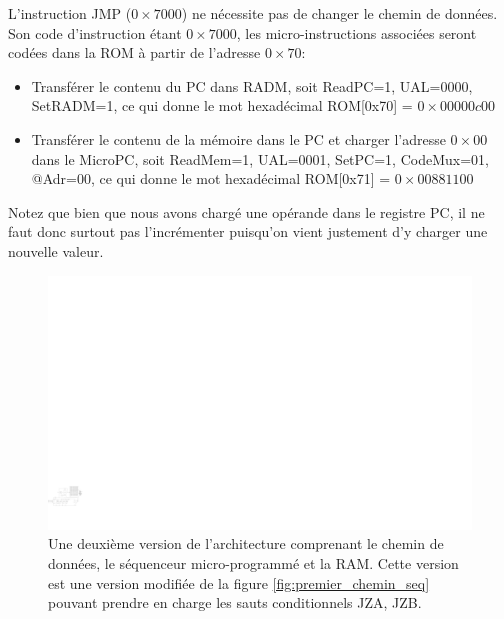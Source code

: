 L'instruction JMP ($0\times7000$) ne nécessite pas de changer le chemin de données. Son code d'instruction étant $0\times7000$, les micro-instructions associées seront codées dans la ROM à partir de l'adresse $0\times70$:
\begin{itemize}
\item Transférer le contenu du PC dans RADM, soit ReadPC=1, UAL=0000, SetRADM=1, ce qui donne le mot hexadécimal ROM[0x70] = $0\times00000c00$
\item Transférer le contenu de la mémoire dans le PC et charger l'adresse $0\times00$ dans le MicroPC, soit ReadMem=1, UAL=0001, SetPC=1, CodeMux=01, @Adr=00, ce qui donne le mot hexadécimal ROM[0x71] = $0\times00881100$
\end{itemize}
Notez que bien que nous avons chargé une opérande dans le registre PC, il ne faut donc surtout pas l'incrémenter puisqu'on vient justement d'y charger une nouvelle valeur. 

\begin{figure}[htbp]
\includegraphics[width=\linewidth]{Figs/premier_chemin_seq_jmp.pdf}
\caption{\label{fig:premier_chemin_seq_jmp} Une deuxième version de l'architecture comprenant le chemin de données, le séquenceur micro-programmé et la RAM. Cette version est une version modifiée de la figure \ref{fig:premier_chemin_seq} pouvant prendre en charge les sauts conditionnels JZA, JZB.}
\end{figure}


